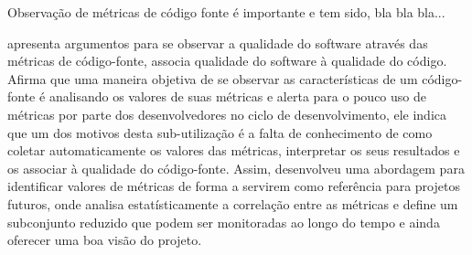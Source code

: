 %
%
%

Observação de métricas de código fonte é importante e tem sido, bla bla bla...

 apresenta argumentos para se observar a qualidade
do software através das métricas de código-fonte, associa qualidade do
software à qualidade do código. Afirma que uma maneira objetiva de se observar
as características de um código-fonte é analisando os valores de suas métricas
e alerta para o pouco uso de métricas por parte dos desenvolvedores no ciclo
de desenvolvimento, ele indica que um dos motivos desta sub-utilização
é a falta de conhecimento de como coletar automaticamente
os valores das métricas, interpretar os seus resultados e os associar à
qualidade do código-fonte. Assim, desenvolveu uma abordagem para identificar
valores de métricas de forma a servirem como referência para projetos futuros,
onde analisa estatísticamente a correlação entre as métricas e define um
subconjunto reduzido que podem ser monitoradas ao longo do tempo e
ainda oferecer uma boa visão do projeto.

